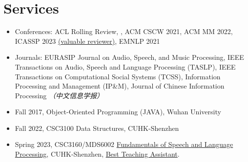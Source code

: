 \documentclass{resume}
\begin{document}
\section{Services}
\begin{itemize}
  \item Conferences: ACL Rolling Review, , ACM CSCW 2021, ACM MM 2022, ICASSP 2023 \href{https://www.zhangxueyao.com/data/presentations/2023_icassp_reviewer.pdf}{(valuable reviewer)}, EMNLP 2021
  \item Journals: EURASIP Journal on Audio, Speech, and Music Processing, IEEE Transactions on Audio, Speech and Language Processing (TASLP), IEEE Transactions on Computational Social Systems (TCSS), Information Processing and Management (IP\&M), Journal of Chinese Information Processing \textit{（中文信息学报）}
\end{itemize}
\begin{itemize}
  \item Fall 2017, Object-Oriented Programming (JAVA), Wuhan University
  \item Fall 2022, CSC3100 Data Structures, CUHK-Shenzhen
  \item Spring 2023, CSC3160/MDS6002 \href{https://drwuz.com/CSC3160/index.html}{Fundamentals of Speech and Language Processing}, CUHK-Shenzhen, \href{https://www.zhangxueyao.com/data/presentations/20230521_ta_award.pdf}{Best Teaching Assistant}.
\end{itemize}
\end{document}
